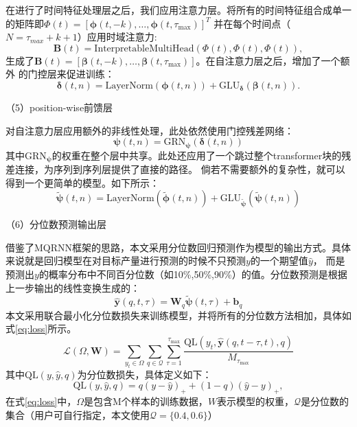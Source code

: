 在进行了时间特征处理层之后，我们应用注意力层。将所有的时间特征组合成单一的矩阵即$\bm{\varPhi }(t) = \left[ \bm{\phi} (t, -k), \ldots, \bm{\phi }(t, \tau_{\text{max}}) \right]^T$
并在每个时间点（$N = \tau _{max} + k + 1$）应用时域注意力:
\begin{equation}
    \mathbf{B}(t) = \text{InterpretableMultiHead}(\mathbf{\varPhi }(t), \mathbf{\varPhi }(t), \mathbf{\varPhi }(t)),
\end{equation}
生成了$\mathbf{B}(t) = \left[ \mathbf{\beta }(t, -k), \ldots, \mathbf{\beta }(t, \tau_{\max}) \right]$。在自注意力层之后，增加了一个额外
的门控层来促进训练：
\begin{equation}
    \boldsymbol{\delta}(t, n) = \text{LayerNorm}(\boldsymbol{\phi }(t, n)) + \text{GLU}_{\boldsymbol{\delta}}(\boldsymbol{\beta}(t, n)).
\end{equation}

（5）position-wise前馈层

对自注意力层应用额外的非线性处理，此处依然使用门控残差网络：
\begin{equation}
    \boldsymbol{\psi}(t, n) = \text{GRN}_{\boldsymbol{\psi}}(\boldsymbol{\delta}(t, n))
\end{equation}
其中$ \text{GRN}_{\boldsymbol{\psi}}$的权重在整个层中共享。此处还应用了一个跳过整个transformer块的残差连接，为序列到序列层提供了直接的路径。
倘若不需要额外的复杂性，就可以得到一个更简单的模型。如下所示：
\begin{equation}
    \tilde{\boldsymbol{\psi}}(t, n) = \text{LayerNorm}(\tilde{\boldsymbol{\phi}}(t, n)) + \text{GLU}_{\tilde{\boldsymbol{\psi}}}(\tilde{\boldsymbol{\psi}}(t, n))
\end{equation}

（6）分位数预测输出层

借鉴了MQRNN框架的思路，本文采用分位数回归预测作为模型的输出方式。具体来说就是回归模型在对目标产量进行预测的时候不只预测$y$的一个期望值$\hat{y}$，
而是预测出$y$的概率分布中不同百分位数（如10\%,50\%,90\%）的值。分位数预测是根据上一步输出的线性变换生成的：
\begin{equation}
    \hat{\boldsymbol{y}}(q, t, \tau) = \mathbf{W}_q \tilde{\boldsymbol{\psi}}(t, \tau) + \mathbf{b}_q
\end{equation}
本文采用联合最小化分位数损失来训练模型，并将所有的分位数方法相加，具体如式\eqref{eq:loss}所示。
\begin{equation}
    \mathcal{L}(\Omega, \mathbf{W}) = \sum_{y_t \in \Omega} \sum_{q \in \mathcal{Q} } \sum_{\tau=1}^{\tau_{\max}} \frac{\text{QL}(y_t, \hat{\boldsymbol{y}}(q, t - \tau, t), q)}{M_{\tau_{\max}}}
    \label{eq:loss}
\end{equation}
其中$\text{QL}(y,\hat{y},q)$为分位数损失，具体定义如下：
\begin{equation}
    \text{QL}(y, \hat{y}, q) = q(y - \hat{y})_+ + (1 - q)(\hat{y} - y)_+,
\end{equation}
在式\eqref{eq:loss}中，$\Omega$是包含M个样本的训练数据，$W$表示模型的权重，$\mathcal{Q}$是分位数的集合（用户可自行指定，本文使用$\mathcal{Q} = \{0.4, 0.6\}$）
